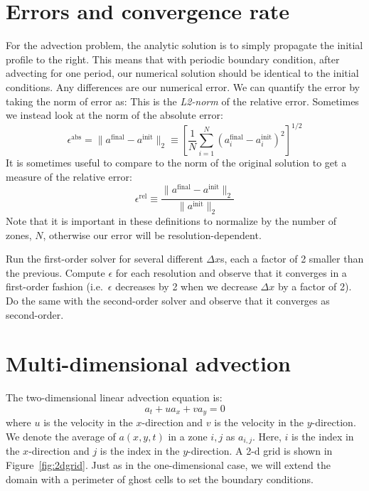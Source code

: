 \section{Errors and convergence rate}

For the advection problem, the analytic solution is to simply propagate
the initial profile to the right.  This means that with periodic boundary
condition, after advecting for one period, our numerical solution should
be identical to the initial conditions.  Any differences are our
numerical error.  We can quantify the error by taking the norm of error as:
This is the {\em L2-norm} of the relative error.  Sometimes we instead look
at the norm of the absolute error:
\begin{equation}
\epsilon^\mathrm{abs} = \| a^\mathrm{final} - a^\mathrm{init} \|_2 \equiv
   \left [ \frac{1}{N} \sum_{i=1}^N 
   ( a_i^\mathrm{final} - a_i^\mathrm{init} )^2
  \right ]^{1/2}
\end{equation}
It is sometimes useful to compare to the norm of the original solution
to get a measure of the relative error:
\begin{equation}
\epsilon^\mathrm{rel} \equiv \frac{\| a^\mathrm{final} - a^\mathrm{init} \|_2}
   {\| a^\mathrm{init} \|_2}
\end{equation}
Note that it is important in these definitions to normalize by the number
of zones, $N$, otherwise our error will be resolution-dependent.
%
\begin{exercise}
{ Run the first-order solver for several different $\Delta x$s,
each a factor of 2 smaller than the previous.  Compute $\epsilon$ for
each resolution and observe that it converges in a first-order fashion
(i.e.\ $\epsilon$ decreases by 2 when we decrease $\Delta x$ by a factor of 2). \\

\noindent Do the same with the second-order solver and observe that it converges
as second-order.
}
\end{exercise}

\section{Multi-dimensional advection}

The two-dimensional linear advection equation is:
\begin{equation}
a_t + u a_x + v a_y = 0
\label{eq:advect2d}
\end{equation}
where $u$ is the velocity in the $x$-direction and $v$ is the velocity in
the $y$-direction.  We denote the average of $a(x,y,t)$ in a zone $i,j$ as
$a_{i,j}$.  Here, $i$ is the index in the $x$-direction and $j$ is the
index in the $y$-direction.  A 2-d grid is shown in Figure~\ref{fig:2dgrid}.
Just as in the one-dimensional case, we will extend the domain with a
perimeter of ghost cells to set the boundary conditions.


